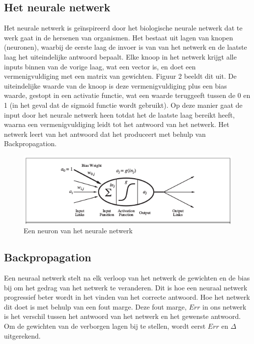 \documentclass[10pt]{article}
\begin{document}
\subsection{Het neurale netwerk}
Het neurale netwerk is ge\"inspireerd door het biologische neurale netwerk dat te werk gaat in de hersenen van organismen. Het bestaat uit lagen van knopen (neuronen), waarbij de eerste laag de invoer is van van het netwerk en de laatste laag het uiteindelijke antwoord bepaalt. Elke knoop in het netwerk krijgt alle inputs binnen van de vorige laag, wat een vector is, en doet een vermenigvuldiging met een matrix van gewichten. Figuur 2 \cite{chapter} beeldt dit uit. De uiteindelijke waarde van de knoop is deze vermenigvuldiging plus een bias waarde, gestopt in een activatie functie, wat een waarde teruggeeft tussen de 0 en 1 (in het geval dat de sigmoid functie wordt gebruikt). Op deze manier gaat de input door het neurale netwerk heen totdat het de laatste laag bereikt heeft, waarna een vermenigvuldiging leidt tot het antwoord van het netwerk. Het netwerk leert van het antwoord dat het produceert met behulp van Backpropagation. 

\begin{figure}[ht]
    \centering
    \includegraphics[scale=0.6]{images/neuron.png}
    \caption{Een neuron van het neurale netwerk}
    \label{fig:my_label}
\end{figure}

\subsection{Backpropagation}
Een neuraal netwerk stelt na elk verloop van het netwerk de gewichten en de bias bij om het gedrag van het netwerk te veranderen. Dit is hoe een neuraal netwerk progressief beter wordt in het vinden van het correcte antwoord. Hoe het netwerk dit doet is met behulp van een fout marge. Deze fout marge, $Err$ in ons netwerk is het verschil tussen het antwoord van het netwerk en het gewenste antwoord. Om de gewichten van de verborgen lagen bij te stellen, wordt eerst $Err$ en $\Delta$ uitgerekend. 
\end{document}
